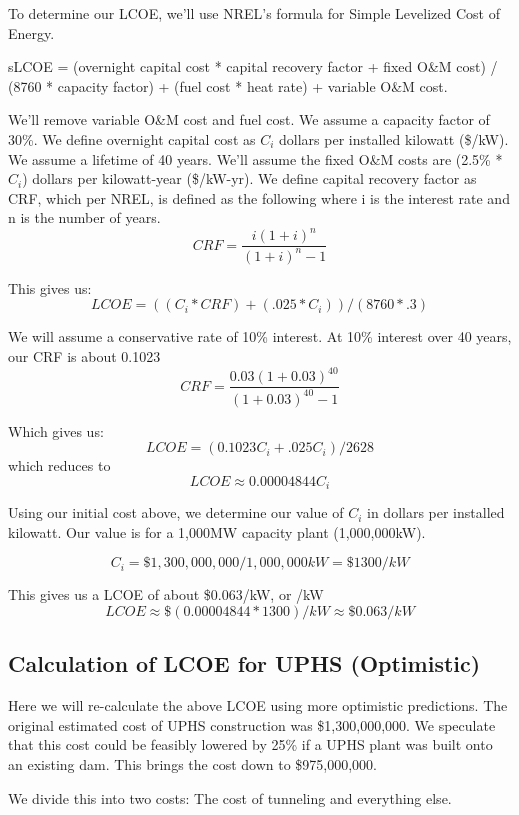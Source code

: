 To determine our LCOE, we'll use NREL's formula for Simple Levelized Cost of Energy.

\begin{displayquote}
sLCOE = {(overnight capital cost * capital recovery factor + fixed O\&M cost) / (8760 * capacity factor)} + (fuel cost * heat rate) + variable O\&M cost. \cite{SimpleLevelizedCostOfEnergyCalculator}
\end{displayquote}

We'll remove variable O\&M cost and fuel cost. We assume a capacity factor of 30\%. We define overnight capital cost as $C_i$ dollars per installed kilowatt (\$/kW). We assume a lifetime of 40 years. We'll assume the fixed O\&M costs are (2.5\% * $C_i$) dollars per kilowatt-year (\$/kW-yr). We define capital recovery factor as CRF, which per NREL, is defined as the following where i is the interest rate and n is the number of years.
\[ \displaystyle CRF={\frac {i(1+i)^{n}}{(1+i)^{n}-1}} \]

This gives us:
\[ LCOE = ((C_i * CRF) + (.025 * C_i)) / (8760 * .3) \]

We will assume a conservative rate of 10\% interest. At 10\% interest over 40 years, our CRF is about 0.1023
\[ \displaystyle CRF={\frac {0.03(1+0.03)^{40}}{(1+0.03)^{40}-1}} \]

Which gives us:
\[ LCOE = (0.1023C_i + .025C_i) / 2628 \]
which reduces to
\[ LCOE \approx 0.00004844 C_i \]

Using our initial cost above, we determine our value of $C_i$ in dollars per installed kilowatt. Our value is for a 1,000MW capacity plant (1,000,000kW).

\[ C_i = \$1,300,000,000 / 1,000,000kW = \$1300/kW\]

This gives us a LCOE of about \$0.063/kW, or /kW
\[ LCOE \approx \$(0.00004844 * 1300)/kW \approx \$0.063/kW \]


\subsection{Calculation of LCOE for UPHS (Optimistic)}
Here we will re-calculate the above LCOE using more optimistic predictions. The original estimated cost of UPHS construction was \$1,300,000,000. We speculate that this cost could be feasibly lowered by 25\% if a UPHS plant was built onto an existing dam. This brings the cost down to \$975,000,000.

We divide this into two costs: The cost of tunneling and everything else.

